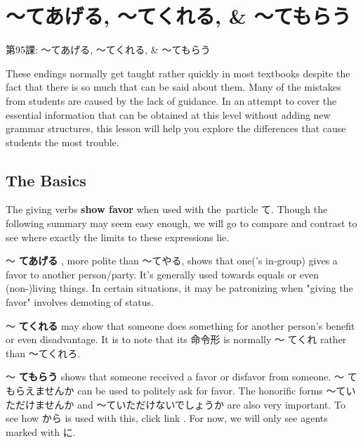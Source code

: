     
\chapter{～てあげる, ～てくれる, \& ～てもらう}

\begin{center}
\begin{Large}
第95課: ～てあげる, ～てくれる, \& ～てもらう 
\end{Large}
\end{center}
 
\par{ These endings normally get taught rather quickly in most textbooks despite the fact that there is so much that can be said about them. Many of the mistakes from students are caused by the lack of guidance. In an attempt to cover the essential information that can be obtained at this level without adding new grammar structures, this lesson will help you explore the differences that cause students the most trouble. }
      
\section{The Basics}
 
\par{ The giving verbs \textbf{show favor }when used with the particle て. Though the following summary may seem easy enough, we will go to compare and contrast to see where exactly the limits to these expressions lie. }
 
\par{～ \textbf{てあげる }, more polite than ～てやる, shows that one('s in-group) gives a favor to another person\slash party. It's generally used towards equals or even (non-)living things. In certain situations, it may be patronizing when "giving the favor" involves demoting of status. }
 
\par{～ \textbf{てくれる }may show that someone does something for another person's benefit or even disadvantage. It is to note that its 命令形 is normally ～ てくれ rather than ～てくれろ. }
 
\par{～ \textbf{てもらう }shows that someone received a favor or disfavor from someone. ～ てもらえませんか can be used to politely ask for favor. The honorific forms ～ていただけませんか and ～ていただけないでしょうか are also very important. To see how から is used with this, click link  . For now, we will only see agents marked with に. }


